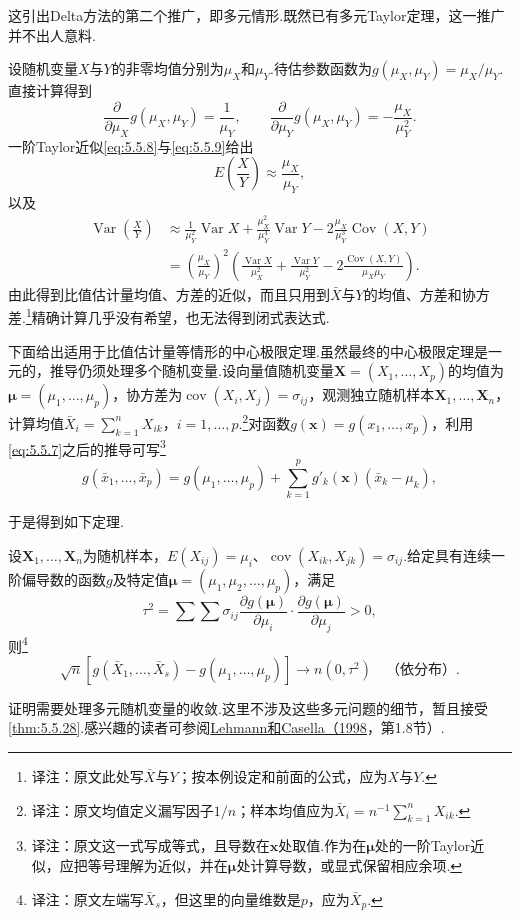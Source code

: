 这引出Delta方法的第二个推广，即多元情形.既然已有多元Taylor定理，这一推广并不出人意料.
\begin{example}[比值估计量的矩]\label{ex:5.5.27}
设随机变量$X$与$Y$的非零均值分别为$\mu_X$和$\mu_Y$.待估参数函数为$g(\mu_X,\mu_Y)=\mu_X/\mu_Y$.直接计算得到
$$\frac\partial{\partial\mu_X}g(\mu_X,\mu_Y)=\frac1{\mu_Y},\qquad
\frac\partial{\partial\mu_Y}g(\mu_X,\mu_Y)=-\frac{\mu_X}{\mu_Y^2}.$$
一阶Taylor近似\eqref{eq:5.5.8}与\eqref{eq:5.5.9}给出
$$E\left(\frac XY\right)\approx\frac{\mu_X}{\mu_Y},$$
以及
\begin{align*}
\operatorname{Var}\left(\frac XY\right)&\approx\frac1{\mu_Y^2}\operatorname{Var}X+\frac{\mu_X^2}{\mu_Y^4}\operatorname{Var}Y-2\frac{\mu_X}{\mu_Y^3}\operatorname{Cov}(X,Y)\\
&=\left(\frac{\mu_X}{\mu_Y}\right)^2\left(\frac{\operatorname{Var}X}{\mu_X^2}+\frac{\operatorname{Var}Y}{\mu_Y^2}-2\frac{\operatorname{Cov}(X,Y)}{\mu_X\mu_Y}\right).
\end{align*}
由此得到比值估计量均值、方差的近似，而且只用到$\bar X$与$Y$的均值、方差和协方差.\footnote{译注：原文此处写$\bar X$与$Y$；按本例设定和前面的公式，应为$X$与$Y$.}精确计算几乎没有希望，也无法得到闭式表达式.
\end{example}
下面给出适用于比值估计量等情形的中心极限定理.虽然最终的中心极限定理是一元的，推导仍须处理多个随机变量.设向量值随机变量$\boldsymbol X=(X_1,\ldots,X_p)$的均值为$\boldsymbol\mu=(\mu_1,\ldots,\mu_p)$，协方差为$\operatorname{cov}(X_i,X_j)=\sigma_{ij}$，观测独立随机样本$\boldsymbol X_1,\ldots,\boldsymbol X_n$，计算均值$\bar X_i=\sum_{k=1}^nX_{ik}$，$i=1,\ldots,p$.\footnote{译注：原文均值定义漏写因子$1/n$；样本均值应为$\bar X_i=n^{-1}\sum_{k=1}^nX_{ik}$.}对函数$g(\boldsymbol x)=g(x_1,\ldots,x_p)$，利用\eqref{eq:5.5.7}之后的推导可写\footnote{译注：原文这一式写成等式，且导数在$\boldsymbol x$处取值.作为在$\boldsymbol\mu$处的一阶Taylor近似，应把等号理解为近似，并在$\boldsymbol\mu$处计算导数，或显式保留相应余项.}
$$g(\bar x_1,\ldots,\bar x_p)=g(\mu_1,\ldots,\mu_p)+\sum_{k=1}^p g'_k(\boldsymbol x)(\bar x_k-\mu_k),$$

于是得到如下定理.
\begin{theorem}[多元Delta方法]\label{thm:5.5.28}
设$\boldsymbol X_1,\ldots,\boldsymbol X_n$为随机样本，$E(X_{ij})=\mu_i$、\allowbreak $\operatorname{cov}(X_{ik},X_{jk})=\sigma_{ij}$.给定具有连续一阶偏导数的函数$g$及特定值$\boldsymbol\mu=(\mu_1,\mu_2,\ldots,\mu_p)$，满足
$$\tau^2=\sum\sum\sigma_{ij}\frac{\partial g(\boldsymbol\mu)}{\partial\mu_i}\cdot\frac{\partial g(\boldsymbol\mu)}{\partial\mu_j}>0,$$
则\footnote{译注：原文左端写$\bar X_s$，但这里的向量维数是$p$，应为$\bar X_p$.}
$$\sqrt n[g(\bar X_1,\ldots,\bar X_s)-g(\mu_1,\ldots,\mu_p)]\to n(0,\tau^2)\quad\text{（依分布）}.$$

\end{theorem}
证明需要处理多元随机变量的收敛.这里不涉及这些多元问题的细节，暂且接受\autoref{thm:5.5.28}.感兴趣的读者可参阅\hyperref[bib:source200]{Lehmann和Casella（1998}，第1.8节）.
